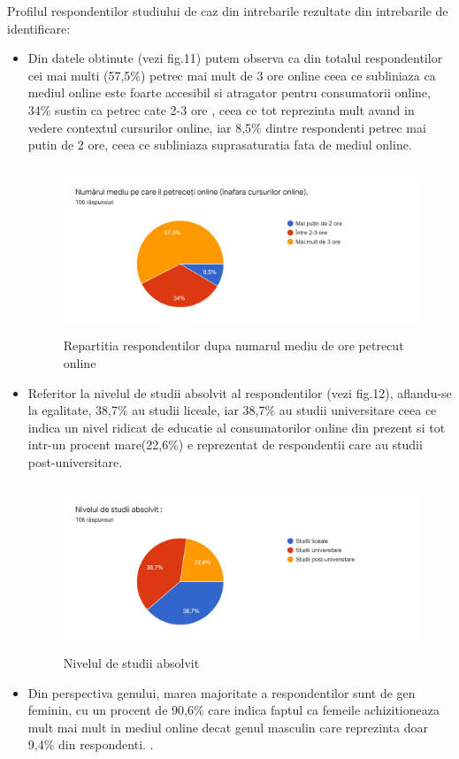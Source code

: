 \documentclass[a4paper, 12pt]{article}
\begin{document}
		\qquad Profilul respondentilor studiului de caz din intrebarile rezultate din intrebarile de identificare:
		\begin{itemize}
			\item Din datele obtinute (vezi fig.11) putem observa ca din totalul respondentilor cei mai multi (57,5\%) petrec mai mult de 3 ore online ceea ce subliniaza ca mediul online este foarte accesibil si atragator pentru consumatorii online, 34\% sustin ca petrec cate 2-3 ore , ceea ce tot reprezinta mult avand in vedere contextul cursurilor online, iar 8,5\% dintre respondenti petrec mai putin de 2 ore, ceea ce subliniaza suprasaturatia  fata de mediul online.
			\begin{figure}[!htb]
				\centering
				\includegraphics[width=12cm, height=5cm]{"figures/prima.jpg"}
				\caption{Repartitia respondentilor dupa numarul mediu de ore petrecut online}\label{fig:zece}
			\end{figure}
		\item Referitor la nivelul de studii absolvit al respondentilor (vezi fig.12), aflandu-se la egalitate, 38,7\% au studii liceale, iar 38,7\% au studii universitare ceea ce indica un nivel ridicat de educatie al consumatorilor online din prezent si tot intr-un procent mare(22,6\%) e reprezentat de respondentii care au studii post-universitare.
			\begin{figure}[!htb]
			\centering
			\includegraphics[width=12cm, height=5cm]{"figures/doi.jpg"}
			\caption{Nivelul de studii absolvit}\label{fig:zece}
		\end{figure}
		\item Din perspectiva genului, marea majoritate a respondentilor sunt de gen feminin, cu un procent de 90,6\% care indica faptul ca femeile achizitioneaza mult mai mult in mediul online decat genul masculin care reprezinta doar 9,4\% din respondenti. .
		\end{itemize}
\end{document}
